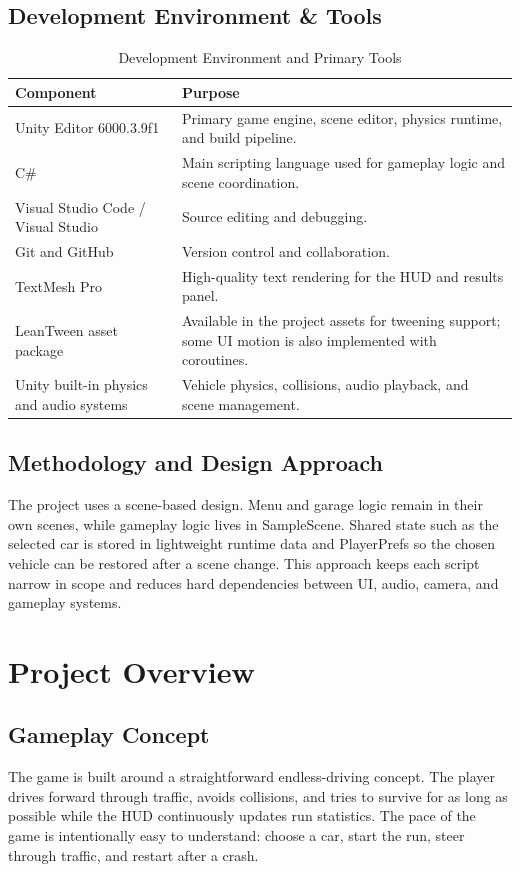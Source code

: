 \documentclass[12pt,a4paper]{article}
\begin{document}
\subsection{Development Environment \& Tools}
\begin{table}[!htbp]
\centering
\caption{Development Environment and Primary Tools}
\begin{tabularx}{\textwidth}{@{}L{4.2cm}Y@{}}
\toprule
Component & Purpose \\
\midrule
Unity Editor 6000.3.9f1 & Primary game engine, scene editor, physics runtime, and build pipeline. \\
C\# & Main scripting language used for gameplay logic and scene coordination. \\
Visual Studio Code / Visual Studio & Source editing and debugging. \\
Git and GitHub & Version control and collaboration. \\
TextMesh Pro & High-quality text rendering for the HUD and results panel. \\
LeanTween asset package & Available in the project assets for tweening support; some UI motion is also implemented with coroutines. \\
Unity built-in physics and audio systems & Vehicle physics, collisions, audio playback, and scene management. \\
\bottomrule
\end{tabularx}
\end{table}

\subsection{Methodology and Design Approach}
The project uses a scene-based design. Menu and garage logic remain in their own scenes, while gameplay logic lives in SampleScene. Shared state such as the selected car is stored in lightweight runtime data and PlayerPrefs so the chosen vehicle can be restored after a scene change. This approach keeps each script narrow in scope and reduces hard dependencies between UI, audio, camera, and gameplay systems.

\section{Project Overview}

\subsection{Gameplay Concept}
The game is built around a straightforward endless-driving concept. The player drives forward through traffic, avoids collisions, and tries to survive for as long as possible while the HUD continuously updates run statistics. The pace of the game is intentionally easy to understand: choose a car, start the run, steer through traffic, and restart after a crash.
\end{document}
